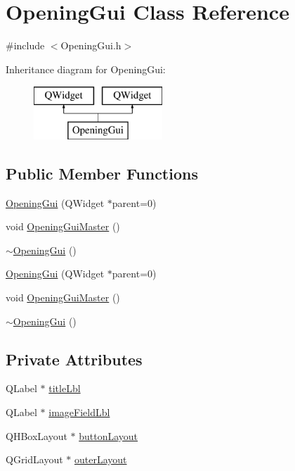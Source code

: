 \hypertarget{class_opening_gui}{\section{Opening\-Gui Class Reference}
\label{class_opening_gui}
}


{\ttfamily \#include $<$Opening\-Gui.\-h$>$}

Inheritance diagram for Opening\-Gui\-:\begin{figure}[H]
\begin{center}
\leavevmode
\includegraphics[height=2.000000cm]{class_opening_gui}
\end{center}
\end{figure}
\subsection*{Public Member Functions}
\begin{DoxyCompactItemize}
\item 
\hyperlink{class_opening_gui_a8a9621b42e164fbd73cf0ccfd64d12c5}{Opening\-Gui} (Q\-Widget $\ast$parent=0)
\item 
void \hyperlink{class_opening_gui_ae772d6266c680dd21543ba1ed95d96ac}{Opening\-Gui\-Master} ()
\item 
\hyperlink{class_opening_gui_ad299c3aa9946713fd0ad67f527f62d51}{$\sim$\-Opening\-Gui} ()
\item 
\hyperlink{class_opening_gui_a8a9621b42e164fbd73cf0ccfd64d12c5}{Opening\-Gui} (Q\-Widget $\ast$parent=0)
\item 
void \hyperlink{class_opening_gui_ae772d6266c680dd21543ba1ed95d96ac}{Opening\-Gui\-Master} ()
\item 
\hyperlink{class_opening_gui_ad299c3aa9946713fd0ad67f527f62d51}{$\sim$\-Opening\-Gui} ()
\end{DoxyCompactItemize}
\subsection*{Private Attributes}
\begin{DoxyCompactItemize}
\item 
Q\-Label $\ast$ \hyperlink{class_opening_gui_a41fe7473171f4be873b83c361cfe83d0}{title\-Lbl}
\item 
Q\-Label $\ast$ \hyperlink{class_opening_gui_a7dcae2d2f9a5d3f384b204a2b41c187f}{image\-Field\-Lbl}
\item 
Q\-H\-Box\-Layout $\ast$ \hyperlink{class_opening_gui_a1f7457b6877577eeede05e83e27aee5b}{button\-Layout}
\item 
Q\-Grid\-Layout $\ast$ \hyperlink{class_opening_gui_ae19bf16c0d64f4ae95027e0ffbaa536d}{outer\-Layout}
\end{DoxyCompactItemize}


